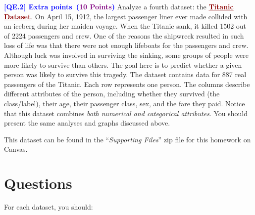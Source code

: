 \documentclass{article}
\newcommand{\HIGHLIGHT}[1]{\textcolor{blue}{\textbf{#1}}}
\newcommand{\POINTS}[1]{\textcolor{purple}{\textbf{{#1}}}}
\begin{document}
\newpage
    \vspace{1.0cm}
    \noindent \textbf{\HIGHLIGHT{[QE.2] Extra points~(\POINTS{10 Points})}} Analyze a fourth dataset: the \textcolor{darkred}{\textbf{\ul{Titanic Dataset}}}. On April 15, 1912, the largest passenger liner ever made collided with an iceberg during her maiden voyage. When the Titanic sank, it killed 1502 out of 2224 passengers and crew. One of the reasons the shipwreck resulted in such loss of life was that there were not enough lifeboats for the passengers and crew. Although luck was involved in surviving the sinking, some groups of people were more likely to survive than others. The goal here is to predict whether a given person was likely to survive this tragedy. The dataset contains data for 887 real passengers of the Titanic. Each row represents one person. The columns describe different attributes of the person, including whether they survived (the class/label), their age, their passenger class, sex, and the fare they paid. Notice that this dataset combines \textit{both numerical and categorical attributes}. You should present the same analyses and graphs discussed above.
    \begin{mybox}[boxgray] 
    This dataset can be found in the ``\textit{Supporting Files}'' zip file for this homework on Canvas.
    \end{mybox}


\section*{Questions}

For each dataset, you should:
\end{document}
